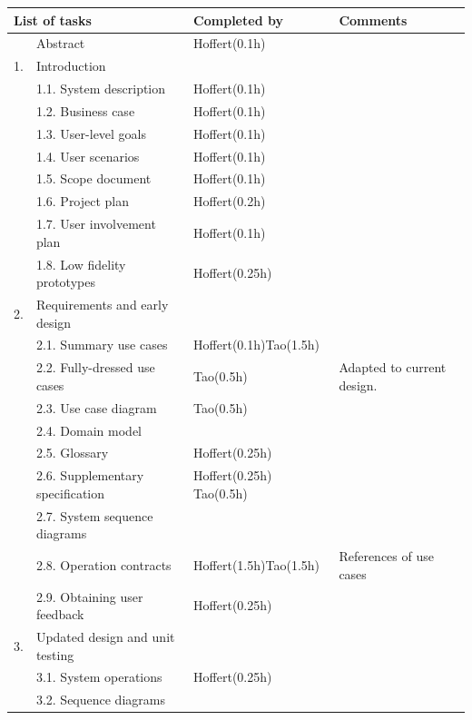 \documentclass[12pt,a4paper]{article}
\begin{document}
\begin{longtable}{| p{0.2cm} p{6.25cm} | p{3cm}| p{5cm} |}
  \hline
  \multicolumn{2}{|l|}{\textbf{List of tasks}} & \textbf{Completed by} & \textbf{Comments} \\ \hline
   & Abstract & Hoffert(0.1h) &  \\ \hline
  1. & Introduction &  &  \\ \hline
   & 1.1. System description & Hoffert(0.1h) &  \\ \hline
   & 1.2. Business case & Hoffert(0.1h) &  \\ \hline
   & 1.3. User-level goals & Hoffert(0.1h) &  \\ \hline
   & 1.4. User scenarios & Hoffert(0.1h) &  \\ \hline
   & 1.5. Scope document & Hoffert(0.1h) &  \\ \hline
   & 1.6. Project plan & Hoffert(0.2h) &  \\ \hline
   & 1.7. User involvement plan & Hoffert(0.1h) &  \\ \hline
   & 1.8. Low fidelity prototypes & Hoffert(0.25h) &  \\ \hline
  2. & Requirements and early design &  &  \\ \hline
   & 2.1. Summary use cases & Hoffert(0.1h)\newline Tao(1.5h) &  \\ \hline
   & 2.2. Fully-dressed use cases & Tao(0.5h) & Adapted to current design. \\ \hline
   & 2.3. Use case diagram & Tao(0.5h) &  \\ \hline
   & 2.4. Domain model &  &  \\ \hline
   & 2.5. Glossary & Hoffert(0.25h) &  \\ \hline
   & 2.6. Supplementary specification & Hoffert(0.25h) \newline Tao(0.5h) &  \\ \hline
   & 2.7. System sequence diagrams &  &  \\ \hline
   & 2.8. Operation contracts & Hoffert(1.5h)\newline Tao(1.5h) & \newline References of use cases  \\ \hline
   & 2.9. Obtaining user feedback & Hoffert(0.25h) &  \\ \hline
  3. & Updated design and unit testing &  &  \\ \hline
   & 3.1. System operations & Hoffert(0.25h) &  \\ \hline
   & 3.2. Sequence diagrams &  &  \\ \hline

\end{longtable}
\end{document}
